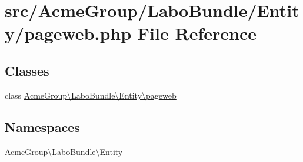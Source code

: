 \hypertarget{_labo_bundle_2_entity_2pageweb_8php}{\section{src/\+Acme\+Group/\+Labo\+Bundle/\+Entity/pageweb.php File Reference}
\label{_labo_bundle_2_entity_2pageweb_8php}
}
\subsection*{Classes}
\begin{DoxyCompactItemize}
\item 
class \hyperlink{class_acme_group_1_1_labo_bundle_1_1_entity_1_1pageweb}{Acme\+Group\textbackslash{}\+Labo\+Bundle\textbackslash{}\+Entity\textbackslash{}pageweb}
\end{DoxyCompactItemize}
\subsection*{Namespaces}
\begin{DoxyCompactItemize}
\item 
 \hyperlink{namespace_acme_group_1_1_labo_bundle_1_1_entity}{Acme\+Group\textbackslash{}\+Labo\+Bundle\textbackslash{}\+Entity}
\end{DoxyCompactItemize}
